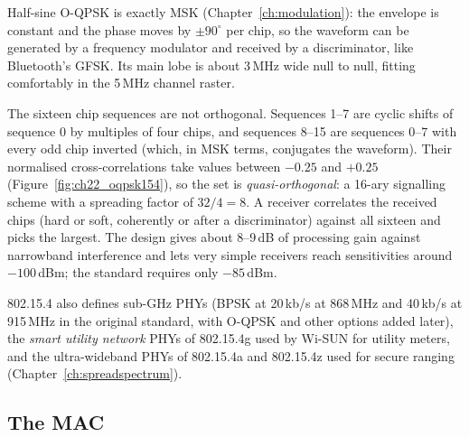 
Half-sine O-QPSK is exactly MSK (Chapter~\ref{ch:modulation}): the envelope is constant and the phase
moves by $\pm90^\circ$ per chip, so the waveform can be generated by a frequency modulator and
received by a discriminator, like Bluetooth's GFSK. Its main lobe is about 3\,MHz wide null to null,
fitting comfortably in the 5\,MHz channel raster.

The sixteen chip sequences are not orthogonal. Sequences 1--7 are cyclic shifts of sequence 0 by
multiples of four chips, and sequences 8--15 are sequences 0--7 with every odd chip inverted (which,
in MSK terms, conjugates the waveform). Their normalised cross-correlations take values between
$-0.25$ and $+0.25$ (Figure~\ref{fig:ch22_oqpsk154}), so the set is \emph{quasi-orthogonal}: a
16-ary signalling scheme with a spreading factor of $32/4=8$. A receiver correlates the received
chips (hard or soft, coherently or after a discriminator) against all sixteen and picks the largest.
The design gives about 8--9\,dB of processing gain against narrowband interference and lets very
simple receivers reach sensitivities around $-100$\,dBm; the standard requires only $-85$\,dBm.

802.15.4 also defines sub-GHz PHYs (BPSK at 20\,kb/s at 868\,MHz and 40\,kb/s at 915\,MHz in the
original standard, with O-QPSK and other options added later), the \emph{smart utility network} PHYs
of 802.15.4g used by Wi-SUN for utility meters, and the ultra-wideband PHYs of 802.15.4a and 802.15.4z
used for secure ranging (Chapter~\ref{ch:spreadspectrum}).

\subsection{The MAC}

